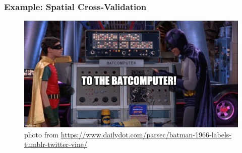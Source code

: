 \documentclass[
  shownotes,
  xcolor={svgnames},
  hyperref={colorlinks,citecolor=DarkBlue,linkcolor=andesred,urlcolor=DarkBlue}
  , aspectratio=169]{beamer}
\begin{document}




\begin{frame}[fragile]
\frametitle{Example: Spatial Cross-Validation}
\begin{figure}[H] \centering
  \centering
  \includegraphics[scale=0.35]{figures/baticomputer_meme.jpg}
  \\
  \tiny photo from \url{https://www.dailydot.com/parsec/batman-1966-labels-tumblr-twitter-vine/}
\end{figure}


\end{frame}

\end{document}
